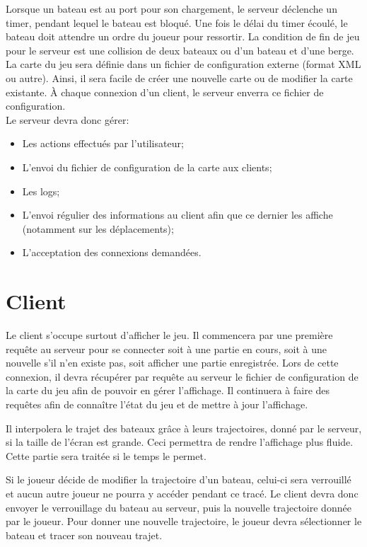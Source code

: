 Lorsque un bateau est au port pour son chargement, le serveur déclenche un timer, pendant lequel le bateau est bloqué. Une fois le délai du timer écoulé, le bateau doit attendre un ordre du joueur pour ressortir.
La condition de fin de jeu pour le serveur est une collision de deux bateaux ou d'un bateau et d'une berge.\\

La carte du jeu sera définie dans un fichier de configuration externe (format XML ou autre). Ainsi, il sera facile de créer une nouvelle carte ou de modifier la carte existante. À chaque connexion d'un client, le serveur enverra ce fichier de configuration.\\

Le serveur devra donc gérer:
\begin{itemize}
\item Les actions effectués par l'utilisateur;
\item L'envoi du fichier de configuration de la carte aux clients;
\item Les logs;
\item L'envoi régulier des informations au client afin que ce dernier les affiche (notamment sur les déplacements);
\item L'acceptation des connexions demandées.
\end{itemize}

\section{Client}
\label{subsec:client}
 
Le client s'occupe surtout d'afficher le jeu. Il commencera par une première requête au serveur pour se connecter soit à une partie en cours, soit à une nouvelle s'il n'en existe pas, soit afficher une partie enregistrée. Lors de cette connexion, il devra récupérer par requête au serveur le fichier de configuration de la carte du jeu afin de pouvoir en gérer l'affichage. Il continuera à faire des requêtes afin de connaître l'état du jeu et de mettre à jour l'affichage.

Il interpolera le trajet des bateaux grâce à leurs trajectoires, donné par le serveur, si la taille de l'écran est grande. Ceci permettra de rendre l'affichage plus fluide. Cette partie sera traitée si le temps le permet.

Si le joueur décide de modifier la trajectoire d'un bateau, celui-ci sera verrouillé et aucun autre joueur ne pourra y accéder pendant ce tracé. Le client devra donc envoyer le verrouillage du bateau au serveur, puis la nouvelle trajectoire donnée par le joueur. Pour donner une nouvelle trajectoire, le joueur devra sélectionner le bateau et tracer son nouveau trajet.

